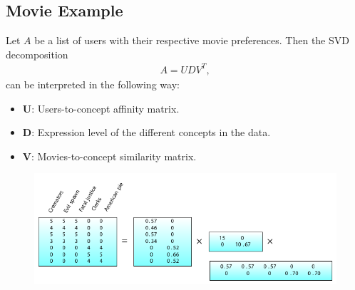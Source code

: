 \subsection{Movie Example}
Let $A$ be a list of users with their respective movie preferences. Then the SVD decomposition
\begin{align*}
    A= UDV^T,
\end{align*}
can be interpreted in the following way:
\begin{itemize}
    \item $\mathbf{U}$: Users-to-concept affinity matrix.
    \item $\mathbf{D}$: Expression level of the different concepts in the data.
    \item $\mathbf{V}$: Movies-to-concept similarity matrix.
\end{itemize}


\begin{figure}[H]
    \centering
    \includegraphics[width=\textwidth]{img/svd_movie}
\end{figure}
